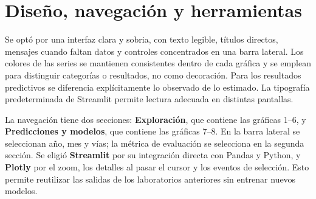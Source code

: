 \documentclass[11pt,letterpaper]{article}
\begin{document}
\section{Diseño, navegación y herramientas}
Se optó por una interfaz clara y sobria, con texto legible, títulos directos, mensajes cuando faltan datos y controles concentrados en una barra lateral. Los colores de las series se mantienen consistentes dentro de cada gráfica y se emplean para distinguir categorías o resultados, no como decoración. Para los resultados predictivos se diferencia explícitamente lo observado de lo estimado. La tipografía predeterminada de Streamlit permite lectura adecuada en distintas pantallas.

La navegación tiene dos secciones: \textbf{Exploración}, que contiene las gráficas 1--6, y \textbf{Predicciones y modelos}, que contiene las gráficas 7--8. En la barra lateral se seleccionan año, mes y vías; la métrica de evaluación se selecciona en la segunda sección. Se eligió \textbf{Streamlit} por su integración directa con Pandas y Python, y \textbf{Plotly} por el zoom, los detalles al pasar el cursor y los eventos de selección. Esto permite reutilizar las salidas de los laboratorios anteriores sin entrenar nuevos modelos.

\begin{center}
\end{center}
\end{document}
